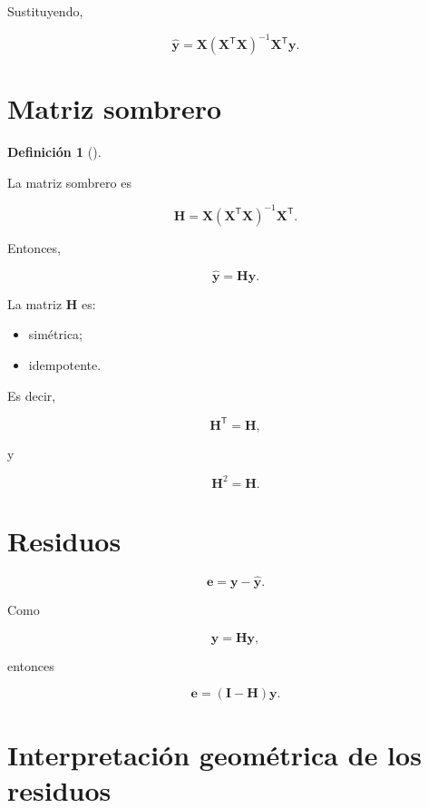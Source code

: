\documentclass[
  spanish,
  10.5pt,
  letterpaper,
  DIV=11,
  numbers=noendperiod,
  oneside,
  open=any]{scrreprt}
\providecommand{\tightlist}{%
  \setlength{\itemsep}{0pt}\setlength{\parskip}{0pt}}
\theoremstyle{definition}
\newtheorem{definition}{Definición}[chapter]
\theoremstyle{definition}
\theoremstyle{plain}
\theoremstyle{remark}
\begin{document}
Sustituyendo,

\[
\widehat{\mathbf{y}}
=
\mathbf{X}
\left(
\mathbf{X}^{\mathsf T}\mathbf{X}
\right)^{-1}
\mathbf{X}^{\mathsf T}
\mathbf{y}.
\]

\section*{Matriz sombrero}\label{matriz-sombrero}


\begin{definition}[]\protect\hypertarget{def-matriz-sombrero-multiple}{}\label{def-matriz-sombrero-multiple}

La matriz sombrero es

\[
\mathbf{H}
=
\mathbf{X}
\left(
\mathbf{X}^{\mathsf T}\mathbf{X}
\right)^{-1}
\mathbf{X}^{\mathsf T}.
\]

\end{definition}

Entonces,

\[
\widehat{\mathbf{y}}
=
\mathbf{H}\mathbf{y}.
\]

La matriz \(\mathbf{H}\) es:

\begin{itemize}
\tightlist
\item
  simétrica;
\item
  idempotente.
\end{itemize}

Es decir,

\[
\mathbf{H}^{\mathsf T}
=
\mathbf{H},
\]

y

\[
\mathbf{H}^2
=
\mathbf{H}.
\]

\section*{Residuos}\label{residuos}


\[
\mathbf{e}
=
\mathbf{y}
-
\widehat{\mathbf{y}}.
\]

Como

\[
\widehat{\mathbf{y}}
=
\mathbf{H}\mathbf{y},
\]

entonces

\[
\mathbf{e}
=
(\mathbf{I}-\mathbf{H})\mathbf{y}.
\]

\section*{Interpretación geométrica de los
residuos}\label{interpretaciuxf3n-geomuxe9trica-de-los-residuos}
\end{document}
